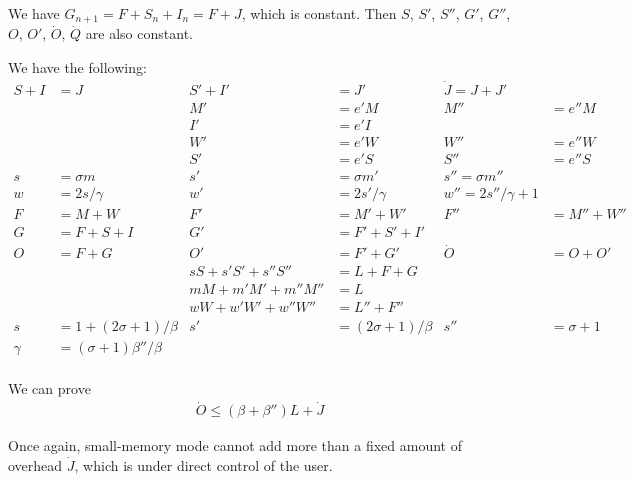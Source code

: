 \documentclass{article}
\begin{document}
We have $G_{n+1} = F + S_n + I_n = F + J$, which is constant. Then $S$,
$S'$, $S''$, $G'$, $G''$, $O$, $O'$, $\dot{O}$, $\dot{Q}$
are also constant.

\bigskip

We have the following:
\begin{align*}
S+I &= J & S'+I' &= J' & \dot{J} = J + J' \\
 & & M' &= e'M  &  M'' &= e''M \\
 & & I' &= e'I \\
 & & W' &= e'W  &  W'' &= e''W \\
 & & S' &= e'S  &  S'' &= e''S \\
 s &= \sigma m  &  s' &= \sigma m'  &  s'' = \sigma m'' \\
 w &= 2s/\gamma  &  w' &= 2s'/\gamma  &  w'' = 2s''/\gamma + 1 \\
F &= M + W  &  F' &= M' + W'  &  F'' &= M'' + W'' \\
G &= F + S + I  &  G' &= F' + S' + I' \\
O &= F + G  &  O' &= F' + G' & \dot{O} &= O + O' \\
  &         & sS + s'S' + s''S'' &= L + F + G \\
             &         &  mM + m'M' + m''M'' &= L \\
             &         &  wW + w'W' + w''W'' &= L'' + F'' \\
 s &= 1 + (2\sigma +1)/\beta  &  s' &= (2\sigma+1)/\beta  &  s'' &=
 \sigma+1 \\
 \gamma &= (\sigma + 1)\beta''/\beta \\
\end{align*}

We can prove %
\begin{gather}
\dot{O} \leq (\beta + \beta'')L + \dot{J}
\end{gather}

Once again, small-memory mode cannot add more than a
fixed amount of overhead $\dot{J}$, which is under direct control of
the user.
\end{document}
